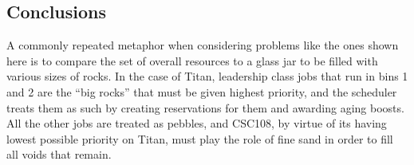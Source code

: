 



\subsection{Conclusions}
\label{subsec:sec4-conclusions}

A commonly repeated metaphor when considering problems like the ones shown here
is to compare the set of overall resources to a glass jar to be filled with
various sizes of rocks. In the case of Titan, leadership class jobs that run in
bins 1 and 2 are the ``big rocks'' that must be given highest priority, and the
scheduler treats them as such by creating reservations for them and awarding
aging boosts. All the other jobs are treated as pebbles, and CSC108, by virtue
of its having lowest possible priority on Titan, must play the role of fine
sand in order to fill all voids that remain.

